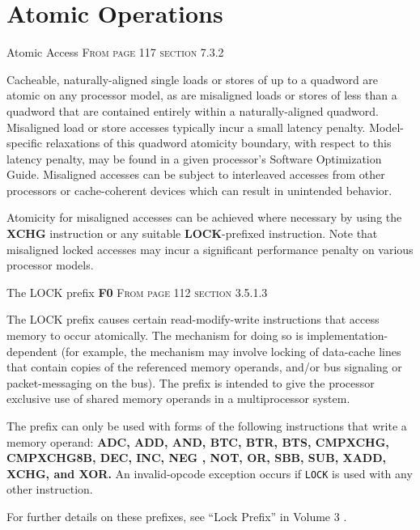 \documentclass[10pt,aspectratio=169]{beamer}
\begin{document}
\section{Atomic Operations}

\begin{frame}{Atomic Access}
    \textsc{From page 117 section 7.3.2 \cite{AMD64ArchVol2}}

    \alert{Cacheable, naturally-aligned single loads or stores} of up to a
quadword \alert{are atomic on any processor model}, as are misaligned loads or stores of less than a quadword that are contained entirely within a naturally-aligned quadword.
Misaligned load or store accesses typically incur a small latency penalty.
Model-specific relaxations of this quadword atomicity boundary, with respect to this latency penalty, may be found in a given processor's Software Optimization Guide.
Misaligned accesses can be subject to interleaved accesses from other processors or cache-coherent devices which can result in unintended behavior.

Atomicity \alert{for misaligned} accesses can be achieved
where necessary by using the \textbf{XCHG} instruction or any suitable \textbf{LOCK}-prefixed instruction.
Note that misaligned locked accesses may incur a significant performance penalty on various processor models.
\end{frame}

\begin{frame}{The LOCK prefix \textbf{F0}}
    \textsc{From page 112 section 3.5.1.3 \cite{AMD64ArchVol1}}

    The LOCK prefix causes certain
read-modify-write instructions that access memory to occur atomically.
The mechanism for doing so is \alert{implementation-dependent} (for example, the mechanism
may involve \alert{locking} of \alert{data-cache lines} that contain copies of
the referenced memory operands, and/or \alert{bus signaling} or packet-messaging on the bus).
The prefix is intended to give the processor exclusive use of shared memory
operands in a multiprocessor system.

The prefix can only be used with forms of the following instructions that write a memory operand:
\textbf{ADC, ADD, AND, BTC, BTR, BTS, CMPXCHG, CMPXCHG8B, DEC, INC, NEG
, NOT, OR, SBB, SUB, XADD, XCHG, and XOR.}
An invalid-opcode exception occurs if
\texttt{LOCK} is used with any other instruction.

For further details on these prefixes, see “Lock Prefix” in Volume 3 \cite{AMD64ArchVol3}.
\end{frame}
\end{document}
